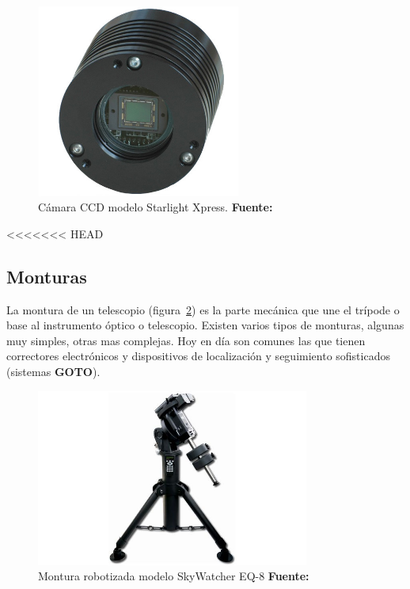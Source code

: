 \begin{itemize}
\begin{itemize}
\begin{figure}[!ht]
	\begin{center}
		\includegraphics[width=0.6\textwidth]{../images/ccd.jpg}
		\caption[Cámara CCD]{Cámara CCD modelo  Starlight Xpress. \textbf{Fuente:}\cite{ccd_ellunatico}}
		\label{fig:ccd}
	\end{center}
\end{figure}


<<<<<<< HEAD
\subsection{Monturas} \label{montura}

La montura de un telescopio (figura~\ref{fig:montura}) es la parte mecánica que une el trípode o base al instrumento óptico o telescopio. Existen varios tipos de monturas, algunas muy simples, otras mas complejas. Hoy en día son comunes las que tienen correctores electrónicos y dispositivos de localización y seguimiento sofisticados (sistemas \textbf{GOTO}).


\begin{figure}[!ht]
	\begin{center}
		\includegraphics[width=0.8\textwidth]{../images/montura.jpg}
		\caption[Montura]{Montura robotizada modelo SkyWatcher EQ-8  \textbf{Fuente:} \cite{montura_ellunatico}}
		\label{fig:montura}
	\end{center}
\end{figure}


\end{itemize}
\end{itemize}
